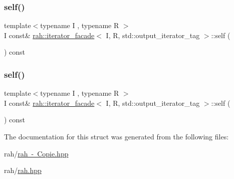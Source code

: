 \subsubsection{\texorpdfstring{self()}{self()}\hspace{0.1cm}{\footnotesize\ttfamily [3/4]}}
{\footnotesize\ttfamily template$<$typename I , typename R $>$ \\
I const\& \mbox{\hyperlink{structrah_1_1iterator__facade}{rah\+::iterator\+\_\+facade}}$<$ I, R, std\+::output\+\_\+iterator\+\_\+tag $>$\+::self (\begin{DoxyParamCaption}{ }\end{DoxyParamCaption}) const\hspace{0.3cm}{\ttfamily [inline]}}

\mbox{\label{structrah_1_1iterator__facade_3_01_i_00_01_r_00_01std_1_1output__iterator__tag_01_4_affe2cc30de7c9e5ea2f5f11e70fe24af}} 
\subsubsection{\texorpdfstring{self()}{self()}\hspace{0.1cm}{\footnotesize\ttfamily [4/4]}}
{\footnotesize\ttfamily template$<$typename I , typename R $>$ \\
I const\& \mbox{\hyperlink{structrah_1_1iterator__facade}{rah\+::iterator\+\_\+facade}}$<$ I, R, std\+::output\+\_\+iterator\+\_\+tag $>$\+::self (\begin{DoxyParamCaption}{ }\end{DoxyParamCaption}) const\hspace{0.3cm}{\ttfamily [inline]}}



The documentation for this struct was generated from the following files\+:\begin{DoxyCompactItemize}
\item 
rah/\mbox{\hyperlink{rah_01-_01_copie_8hpp}{rah -\/ Copie.\+hpp}}\item 
rah/\mbox{\hyperlink{rah_8hpp}{rah.\+hpp}}\end{DoxyCompactItemize}
